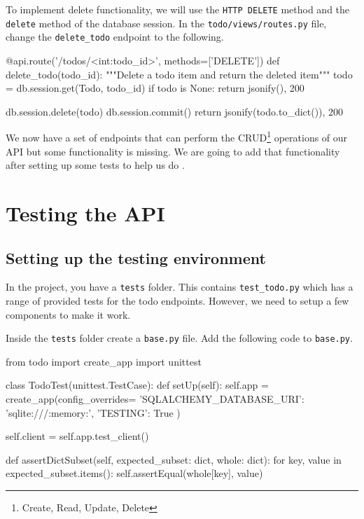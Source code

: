 \documentclass{csse4400}
\begin{document}
To implement delete functionality, we will use the \texttt{HTTP DELETE} method and the \texttt{delete} method of the database session.
In the \texttt{todo/views/routes.py} file, change the \texttt{delete\_todo} endpoint to the following.

\begin{code}[language=python,numbers=none]{}
@api.route('/todos/<int:todo_id>', methods=['DELETE'])
def delete_todo(todo_id):
    """Delete a todo item and return the deleted item"""
    todo = db.session.get(Todo, todo_id)
    if todo is None:
        return jsonify({}), 200

    db.session.delete(todo)
    db.session.commit()
    return jsonify(todo.to_dict()), 200
\end{code}

We now have a set of endpoints that can perform the CRUD\footnote{Create, Read, Update, Delete}
operations of our API but some functionality is missing.
We are going to add that functionality after setting up some tests to help us do
.


\section{Testing the API}

\subsection{Setting up the testing environment}

In the project, you have a \texttt{tests} folder.
This contains \texttt{test\_todo.py} which has a range of provided tests for the todo endpoints.
However, we need to setup a few components to make it work.

Inside the \texttt{tests} folder create a \texttt{base.py} file.
Add the following code to \texttt{base.py}.

\begin{code}[language=python,numbers=none]{}
  from todo import create_app
  import unittest
  
  class TodoTest(unittest.TestCase):
      def setUp(self):
          self.app = create_app(config_overrides={
              'SQLALCHEMY_DATABASE_URI': 'sqlite:///:memory:',
              'TESTING': True
          })
  
          self.client = self.app.test_client()
  
      def assertDictSubset(self, expected_subset: dict, whole: dict):
          for key, value in expected_subset.items():
              self.assertEqual(whole[key], value)
\end{code}
\end{document}
